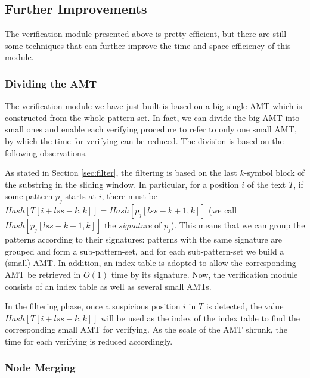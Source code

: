 \subsection{Further Improvements}
\label{sec:further improments}

The verification module presented above is pretty efficient, but there
are still some techniques that can further improve the time and space
efficiency of this module.

\subsubsection{Dividing the AMT}
\label{sec:divide amt}

The verification module we have just built is based on a big single
AMT which is constructed from the whole pattern set. In fact, we can
divide the big AMT into small ones and enable each verifying procedure
to refer to only one small AMT, by which the time for verifying can be
reduced. The division is based on the following observations.

As stated in Section \ref{sec:filter}, the filtering is based on the
last $k$-symbol block of the substring in the sliding window. In
particular, for a position $i$ of the text $T$, if some pattern $p_j$
starts at $i$, there must be
$Hash[T[i+lss-k,k]] = Hash[p_j[lss-k+1,k]]$ (we call
$Hash[p_j[lss-k+1,k]]$ the \emph{signature} of $p_j$). This means that
we can group the patterns according to their signatures: patterns with
the same signature are grouped and form a sub-pattern-set, and for
each sub-pattern-set we build a (small) AMT. In addition, an index
table is adopted to allow the corresponding AMT be retrieved in $O(1)$
time by its signature. Now, the verification module consists of an
index table as well as several small AMTs.

In the filtering phase, once a suspicious position $i$ in $T$ is
detected, the value $Hash[T[i+lss-k,k]]$ will be used as the index of
the index table to find the corresponding small AMT for verifying. As
the scale of the AMT shrunk, the time for each verifying is reduced
accordingly.

\subsubsection{Node Merging}
\label{sec:node merge}

